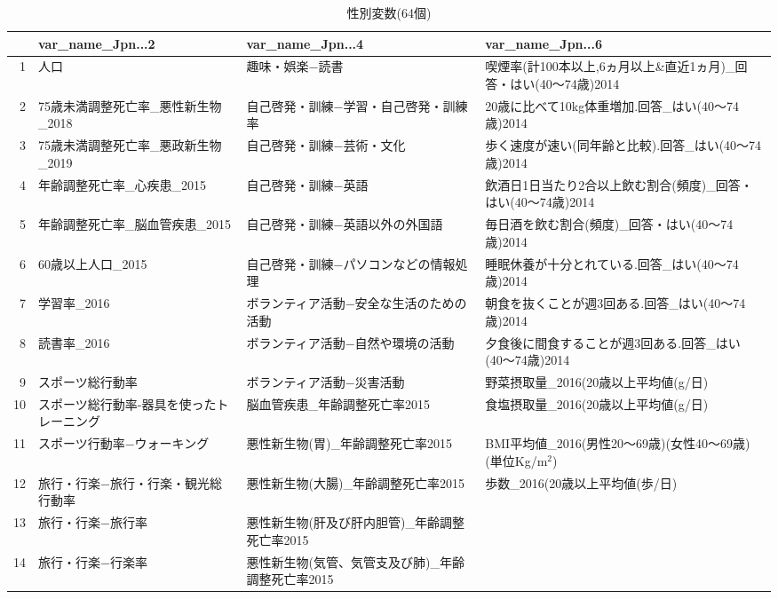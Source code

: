\begin{table}[ht]
\centering
\caption{性別変数(64個)}
\label{table_mf_d.tex}
\begingroup\tiny

\begin{adjustbox}{width=.5\textwidth}
\begin{tabular}{rlll}
  \hline
 & var\_name\_Jpn...2 & var\_name\_Jpn...4 & var\_name\_Jpn...6 \\
  \hline
1 & 人口 & 趣味・娯楽−読書 & 喫煙率(計100本以上,6ヵ月以上\&直近1ヵ月)\_回答・はい(40〜74歳)2014 \\
  2 & 75歳未満調整死亡率\_悪性新生物\_2018 & 自己啓発・訓練−学習・自己啓発・訓練率 & 20歳に比べて10kg体重増加.回答\_はい(40〜74歳)2014 \\
  3 & 75歳未満調整死亡率\_悪政新生物\_2019 & 自己啓発・訓練−芸術・文化 & 歩く速度が速い(同年齢と比較).回答\_はい(40〜74歳)2014 \\
  4 & 年齢調整死亡率\_心疾患\_2015 & 自己啓発・訓練−英語 & 飲酒日1日当たり2合以上飲む割合(頻度)\_回答・はい(40〜74歳)2014 \\
  5 & 年齢調整死亡率\_脳血管疾患\_2015 & 自己啓発・訓練−英語以外の外国語 & 毎日酒を飲む割合(頻度)\_回答・はい(40〜74歳)2014 \\
  6 & 60歳以上人口\_2015 & 自己啓発・訓練−パソコンなどの情報処理 & 睡眠休養が十分とれている.回答\_はい(40〜74歳)2014 \\
  7 & 学習率\_2016 & ボランティア活動−安全な生活のための活動 & 朝食を抜くことが週3回ある.回答\_はい(40〜74歳)2014 \\
  8 & 読書率\_2016 & ボランティア活動−自然や環境の活動 & 夕食後に間食することが週3回ある.回答\_はい(40〜74歳)2014 \\
  9 & スポーツ総行動率 & ボランティア活動−災害活動 & 野菜摂取量\_2016(20歳以上平均値(g/日) \\
  10 & スポーツ総行動率-器具を使ったトレーニング & 脳血管疾患\_年齢調整死亡率2015 & 食塩摂取量\_2016(20歳以上平均値(g/日) \\
  11 & スポーツ行動率−ウォーキング & 悪性新生物(胃)\_年齢調整死亡率2015 & BMI平均値\_2016(男性20〜69歳)(女性40〜69歳)(単位Kg/m$^2$) \\
  12 & 旅行・行楽−旅行・行楽・観光総行動率 & 悪性新生物(大腸)\_年齢調整死亡率2015 & 歩数\_2016(20歳以上平均値(歩/日) \\
  13 & 旅行・行楽−旅行率 & 悪性新生物(肝及び肝内胆管)\_年齢調整死亡率2015 &  \\
  14 & 旅行・行楽−行楽率 & 悪性新生物(気管、気管支及び肺)\_年齢調整死亡率2015 &  \\

\end{tabular}
\end{adjustbox}
\end{table}
